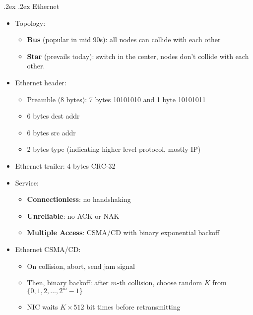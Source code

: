 \documentclass[10pt,landscape,a4paper]{article}
\makeatletter
\renewcommand{\subsubsection}{\@startsection{subsubsection}{1}{0mm}%
  {.2ex}%
  {.2ex}%
  {\rmfamily\bfseries}}
\makeatother
\begin{document}
\begin{multicols*}{4}
  \subsubsection{Ethernet}
  \begin{itemize}
    \item Topology:
          \begin{itemize}
            \item \textbf{Bus} (popular in mid 90s): all nodes can collide with each other
            \item \textbf{Star} (prevails today): switch in the center, nodes don't collide with each other.
          \end{itemize}
    \item Ethernet header:
          \begin{itemize}
            \item Preamble (8 bytes): 7 bytes 10101010 and 1 byte 10101011
            \item 6 bytes dest addr
            \item 6 bytes src addr
            \item 2 bytes type (indicating higher level protocol, mostly IP)
          \end{itemize}
    \item Ethernet trailer: 4 bytes CRC-32
    \item Service:
          \begin{itemize}
            \item \textbf{Connectionless}: no handshaking
            \item \textbf{Unreliable}: no ACK or NAK
            \item \textbf{Multiple Access}: CSMA/CD with binary exponential backoff
          \end{itemize}
    \item Ethernet CSMA/CD:
          \begin{itemize}
            \item On collision, abort, send jam signal
            \item Then, binary backoff: after $m$-th collision, choose random $K$ from $\{0, 1, 2, ..., 2^m - 1\}$
            \item NIC waits $K \times 512$ bit times before retransmitting
          \end{itemize}
  \end{itemize}


\end{multicols*}
\end{document}
